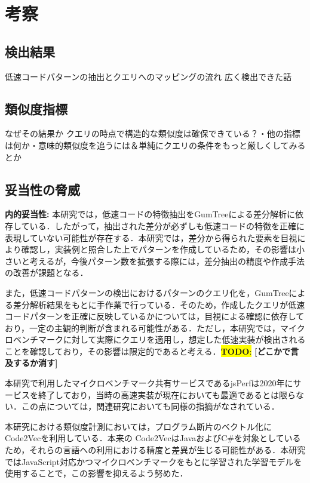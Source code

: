 \documentclass[submit,techrep,noauthor]{ipsj}
\newcommand{\todo}[1]{\colorbox{yellow}{{\bf TODO}:}{\color{red} {\textbf{[#1]}}}}
\begin{document}
\section{考察}
\label{sec:discussion}



\subsection{検出結果}

低速コードパターンの抽出とクエリへのマッピングの流れ
広く検出できた話

\subsection{類似度指標}

なぜその結果か
クエリの時点で構造的な類似度は確保できている？・他の指標は何か・意味的類似度を追うには＆単純にクエリの条件をもっと厳しくしてみるとか

\subsection{妥当性の脅威}

\noindent\textbf{内的妥当性: }
本研究では，低速コードの特徴抽出をGumTreeによる差分解析に依存している．したがって，抽出された差分が必ずしも低速コードの特徴を正確に表現していない可能性が存在する．本研究では，差分から得られた要素を目視により確認し，実装例と照合した上でパターンを作成しているため，その影響は小さいと考えるが，今後パターン数を拡張する際には，差分抽出の精度や作成手法の改善が課題となる．

また，低速コードパターンの検出におけるパターンのクエリ化を，GumTreeによる差分解析結果をもとに手作業で行っている．そのため，作成したクエリが低速コードパターンを正確に反映しているかについては，目視による確認に依存しており，一定の主観的判断が含まれる可能性がある．ただし，本研究では，マイクロベンチマークに対して実際にクエリを適用し，想定した低速実装が検出されることを確認しており，その影響は限定的であると考える．\todo{どこかで言及するか消す}

本研究で利用したマイクロベンチマーク共有サービスであるjsPerfは2020年にサービスを終了しており，当時の高速実装が現在においても最適であるとは限らない．この点については，関連研究\cite{omori}においても同様の指摘がなされている．

本研究における類似度計測においては，プログラム断片のベクトル化にCode2Vecを利用している．本来の Code2VecはJavaおよびC\#を対象としているため，それらの言語への利用における精度と差異が生じる可能性がある．本研究ではJavaScript対応かつマイクロベンチマークをもとに学習された学習モデル\cite{saiki}を使用することで，この影響を抑えるよう努めた．
\end{document}
